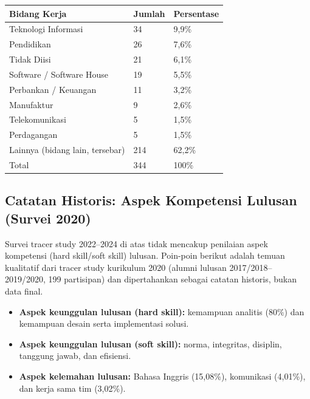 \begin{center}
\begin{tabular}{L{7cm}C{2cm}C{2.5cm}}
\toprule
Bidang Kerja & Jumlah & Persentase \\
\midrule
Teknologi Informasi & 34 & 9,9\% \\
Pendidikan & 26 & 7,6\% \\
Tidak Diisi & 21 & 6,1\% \\
Software / Software House & 19 & 5,5\% \\
Perbankan / Keuangan & 11 & 3,2\% \\
Manufaktur & 9 & 2,6\% \\
Telekomunikasi & 5 & 1,5\% \\
Perdagangan & 5 & 1,5\% \\
Lainnya (bidang lain, tersebar) & 214 & 62,2\% \\
\midrule
Total & 344 & 100\% \\
\bottomrule
\end{tabular}
\end{center}

\subsection{Catatan Historis: Aspek Kompetensi Lulusan (Survei 2020)}

Survei tracer study 2022--2024 di atas tidak mencakup penilaian aspek kompetensi (hard skill/soft skill) lulusan. Poin-poin berikut adalah temuan kualitatif dari tracer study kurikulum 2020 (alumni lulusan 2017/2018--2019/2020, 199 partisipan) dan dipertahankan sebagai catatan historis, bukan data final.

\begin{itemize}
\item \textbf{Aspek keunggulan lulusan (hard skill):} kemampuan analitis (80\%) dan kemampuan desain serta implementasi solusi.
\item \textbf{Aspek keunggulan lulusan (soft skill):} norma, integritas, disiplin, tanggung jawab, dan efisiensi.
\item \textbf{Aspek kelemahan lulusan:} Bahasa Inggris (15,08\%), komunikasi (4,01\%), dan kerja sama tim (3,02\%).
\end{itemize}

\renewcommand{\arraystretch}{1.08}

